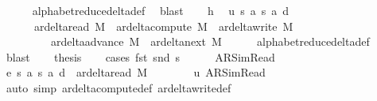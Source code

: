 \begin{isabellebody}
\ \ \ \ \isamarkupfalse%
\ alphabet{\isacharunderscore}{\kern0pt}reduce{\isacharunderscore}{\kern0pt}delta{\isacharunderscore}{\kern0pt}def\ \isamarkupfalse%
\ blast\isanewline
\ \ \isamarkupfalse%
\ h{}\ \isamarkupfalse%
\ u{}{\isacharcolon}{\kern0pt}\ {\isachardoublequoteopen}{\isacharparenleft}{\kern0pt}s{\isacharcomma}{\kern0pt}\ a{\isacharcomma}{\kern0pt}\ s{}{\isacharcomma}{\kern0pt}\ a{}{\isacharcomma}{\kern0pt}\ d{}{\isacharparenright}{\kern0pt}\ {\isasymin}\isanewline
\ \ \ \ \ \ ar{\isacharunderscore}{\kern0pt}delta{\isacharunderscore}{\kern0pt}read\ M\ {\isasymunion}\ ar{\isacharunderscore}{\kern0pt}delta{\isacharunderscore}{\kern0pt}compute\ M\ {\isasymunion}\ ar{\isacharunderscore}{\kern0pt}delta{\isacharunderscore}{\kern0pt}write\ M\isanewline
\ \ \ \ \ \ \ \ {\isasymunion}\ ar{\isacharunderscore}{\kern0pt}delta{\isacharunderscore}{\kern0pt}advance\ M\ {\isasymunion}\ ar{\isacharunderscore}{\kern0pt}delta{\isacharunderscore}{\kern0pt}next\ M{\isachardoublequoteclose}\isanewline
\ \ \ \ \isamarkupfalse%
\ alphabet{\isacharunderscore}{\kern0pt}reduce{\isacharunderscore}{\kern0pt}delta{\isacharunderscore}{\kern0pt}def\ \isamarkupfalse%
\ blast\isanewline
\ \ \isamarkupfalse%
\ {\isacharquery}{\kern0pt}thesis\isanewline
\ \ \isamarkupfalse%
\ {\isacharparenleft}{\kern0pt}cases\ {\isachardoublequoteopen}fst\ {\isacharparenleft}{\kern0pt}snd\ s{\isacharparenright}{\kern0pt}{\isachardoublequoteclose}{\isacharparenright}{\kern0pt}\isanewline
\ \ \ \ \isamarkupfalse%
\ AR{\isacharunderscore}{\kern0pt}SimRead\isanewline
\ \ \ \ \isamarkupfalse%
\ e{}{\isacharcolon}{\kern0pt}\ {\isachardoublequoteopen}{\isacharparenleft}{\kern0pt}s{\isacharcomma}{\kern0pt}\ a{\isacharcomma}{\kern0pt}\ s{}{\isacharcomma}{\kern0pt}\ a{}{\isacharcomma}{\kern0pt}\ d{}{\isacharparenright}{\kern0pt}\ {\isasymin}\ ar{\isacharunderscore}{\kern0pt}delta{\isacharunderscore}{\kern0pt}read\ M{\isachardoublequoteclose}\isanewline
\ \ \ \ \ \ \isamarkupfalse%
\ u{}\ AR{\isacharunderscore}{\kern0pt}SimRead\isanewline
\ \ \ \ \ \ \isamarkupfalse%
\ {\isacharparenleft}{\kern0pt}auto\ simp{\isacharcolon}{\kern0pt}\ ar{\isacharunderscore}{\kern0pt}delta{\isacharunderscore}{\kern0pt}compute{\isacharunderscore}{\kern0pt}def\ ar{\isacharunderscore}{\kern0pt}delta{\isacharunderscore}{\kern0pt}write{\isacharunderscore}{\kern0pt}def\isanewline

\end{isabellebody}
